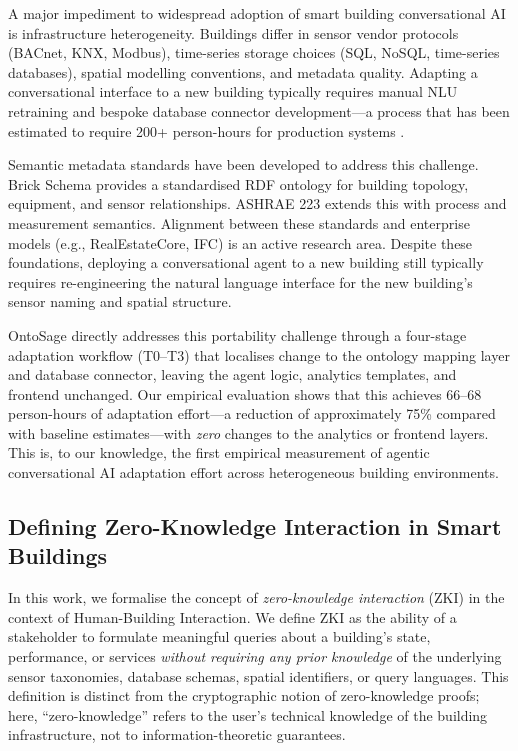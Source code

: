 \documentclass[acmsmall]{acmart}
\begin{document}
A major impediment to widespread adoption of smart building conversational AI is infrastructure heterogeneity. Buildings differ in sensor vendor protocols (BACnet, KNX, Modbus), time-series storage choices (SQL, NoSQL, time-series databases), spatial modelling conventions, and metadata quality. Adapting a conversational interface to a new building typically requires manual NLU retraining and bespoke database connector development---a process that has been estimated to require 200+ person-hours for production systems \cite{Nabavi2023}.

Semantic metadata standards have been developed to address this challenge. Brick Schema \cite{galanos2023} provides a standardised RDF ontology for building topology, equipment, and sensor relationships. ASHRAE 223 extends this with process and measurement semantics. Alignment between these standards and enterprise models (e.g., RealEstateCore, IFC) is an active research area. Despite these foundations, deploying a conversational agent to a new building still typically requires re-engineering the natural language interface for the new building's sensor naming and spatial structure.

OntoSage directly addresses this portability challenge through a four-stage adaptation workflow (T0--T3) that localises change to the ontology mapping layer and database connector, leaving the agent logic, analytics templates, and frontend unchanged. Our empirical evaluation shows that this achieves 66--68 person-hours of adaptation effort---a reduction of approximately 75\% compared with baseline estimates---with \emph{zero} changes to the analytics or frontend layers. This is, to our knowledge, the first empirical measurement of agentic conversational AI adaptation effort across heterogeneous building environments.

\subsection{Defining Zero-Knowledge Interaction in Smart Buildings}
\label{sec:zero-knowledge}

In this work, we formalise the concept of \emph{zero-knowledge interaction} (ZKI) in the context of Human-Building Interaction. We define ZKI as the ability of a stakeholder to formulate meaningful queries about a building's state, performance, or services \emph{without requiring any prior knowledge} of the underlying sensor taxonomies, database schemas, spatial identifiers, or query languages. This definition is distinct from the cryptographic notion of zero-knowledge proofs; here, ``zero-knowledge'' refers to the user's technical knowledge of the building infrastructure, not to information-theoretic guarantees.
\end{document}
